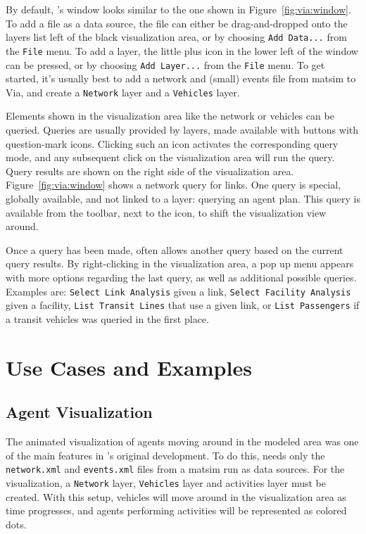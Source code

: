 By default, \Via{}'s window looks similar to the one shown in Figure~\ref{fig:via:window}.
To add a file as a data source, the file can either be drag-and-dropped onto the layers
list left of the black visualization area, or by choosing \lstinline|Add Data...|
from the \lstinline|File| menu. To add a layer, the little plus icon in the lower left of
the window can be pressed, or by choosing \lstinline|Add Layer...| from the \lstinline|File|
menu. To get started, it's usually best to add a network and (small) events
file from \gls{matsim} to Via, and create a \lstinline|Network| layer and a \lstinline|Vehicles| layer.

Elements shown in the visualization area like the network or vehicles can
be queried. Queries are usually provided by layers, made available with buttons
with question-mark icons. Clicking such an icon activates the corresponding
query mode, and any subsequent click on the visualization area will run the
query.
Query results are shown on the right side of the visualization area.
Figure~\ref{fig:via:window} shows a network query for links.
One query is special, globally available, and not linked to a
layer: querying an agent plan. This query is available from the toolbar, next to
the icon, to shift the visualization view around.

Once a query has been made, \Via{} often allows another query based on the
current query results. By right-clicking in the visualization area, a pop up menu
appears with more options regarding the last query, as well as additional
possible queries. Examples are: \lstinline|Select Link Analysis|
given a link, \lstinline|Select Facility Analysis| given a facility, \lstinline|List Transit Lines| that
use a given link, or \lstinline|List Passengers| if a transit vehicles was queried in the
first place.

\section{Use Cases and Examples}
\subsection{Agent Visualization}
The animated visualization of agents moving around in the modeled area was one
of the main features in \Via{}'s original development. To do this, \Via{}
needs only the \lstinline|network.xml| and \lstinline|events.xml| files from a \gls{matsim} run
as data sources. For the visualization, a \lstinline|Network| layer, \lstinline|Vehicles| layer and
activities layer must be created. With this setup, vehicles will move around in
the visualization area as time progresses, and agents performing
activities will be represented as colored dots.

